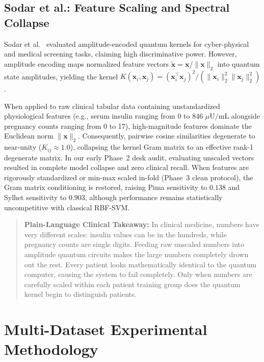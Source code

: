 \documentclass[journal,twocolumn]{IEEEtran}
\begin{document}
\subsection{Sodar et al.: Feature Scaling and Spectral Collapse}
Sodar et al.~\cite{sodar2026} evaluated amplitude-encoded quantum kernels for cyber-physical and medical screening tasks, claiming high discriminative power. However, amplitude encoding maps normalized feature vectors $\tilde{\mathbf{x}} = \mathbf{x}/\|\mathbf{x}\|_2$ into quantum state amplitudes, yielding the kernel $K(\mathbf{x}_i, \mathbf{x}_j) = (\mathbf{x}_i^\top \mathbf{x}_j)^2 / (\|\mathbf{x}_i\|_2^2 \|\mathbf{x}_j\|_2^2)$.

When applied to raw clinical tabular data containing unstandardized physiological features (e.g., serum insulin ranging from 0 to 846 $\mu\text{U/mL}$ alongside pregnancy counts ranging from 0 to 17), high-magnitude features dominate the Euclidean norm $\|\mathbf{x}\|_2$. Consequently, pairwise cosine similarities degenerate to near-unity ($K_{ij} \approx 1.0$), collapsing the kernel Gram matrix to an effective rank-1 degenerate matrix. In our early Phase~2 desk audit, evaluating unscaled vectors resulted in complete model collapse and zero clinical recall. When features are rigorously standardized or min-max scaled in-fold (Phase~3 clean protocol), the Gram matrix conditioning is restored, raising Pima sensitivity to $0.138$ and Sylhet sensitivity to $0.903$, although performance remains statistically uncompetitive with classical RBF-SVM.

\begin{quote}
\small
\textbf{Plain-Language Clinical Takeaway:} In clinical medicine, numbers have very different scales: insulin values can be in the hundreds, while pregnancy counts are single digits. Feeding raw unscaled numbers into amplitude quantum circuits makes the large numbers completely drown out the rest. Every patient looks mathematically identical to the quantum computer, causing the system to fail completely. Only when numbers are carefully scaled within each patient training group does the quantum kernel begin to distinguish patients.
\end{quote}

\section{Multi-Dataset Experimental Methodology}
\label{sec:methodology}
\end{document}
